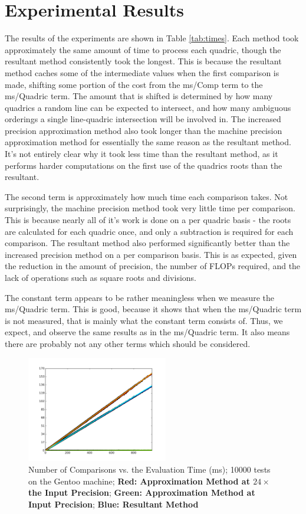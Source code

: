 \documentclass{cccg16}
\begin{document}
\section{Experimental Results}
The results of the experiments are shown in Table \ref{tab:times}.
Each method took approximately the same amount of time to process each
quadric, though the resultant method consistently took the longest.
This is because the resultant method caches some of the intermediate
values when the first comparison is made, shifting some portion of the
cost from the ms/Comp term to the ms/Quadric term.  The
amount that is shifted is determined by how many quadrics a random
line can be expected to intersect, and how many ambiguous orderings a
single line-quadric intersection will be involved in.  The increased
precision approximation method also took longer than the machine
precision approximation method for essentially the same reason as the
resultant method.  It's not entirely clear why it took less time than
the resultant method, as it performs harder computations on the first
use of the quadrics roots than the resultant.

The second term is approximately how much time each comparison takes.
Not surprisingly, the machine precision method took very little time
per comparison.  This is because nearly all of it's work is done on a
per quadric basis - the roots are calculated for each quadric once,
and only a subtraction is required for each comparison. The resultant
method also performed significantly better than the increased
precision method on a per comparison basis.  This is as expected,
given the reduction in the amount of precision, the number of FLOPs
required, and the lack of operations such as square roots and
divisions.

The constant term appears to be rather meaningless when we measure the
ms/Quadric term.  This is good, because it shows that when the
ms/Quadric term is not measured, that is mainly what the constant term
consists of.  Thus, we expect, and observe the same results as in the
ms/Quadric term.  It also means there are probably not any other terms
which should be considered.

\begin{figure}
  \includegraphics[width=0.55\textwidth]{imgs/hardEllipsoidsSingle_gentoo_adjusted.png}
  \caption{Number of Comparisons vs. the Evaluation Time (ms); 10000
    tests on the Gentoo machine; {\bf Red: Approximation Method at
      $24\times$ the Input Precision}; {\bf Green: Approximation
      Method at Input Precision}; {\bf Blue: Resultant Method}}
  \label{fig:linefit}
\end{figure}
\end{document}
